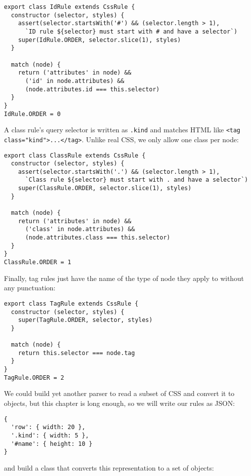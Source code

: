 \documentclass[krantzl]{krantz}
\begin{document}
\begin{lstlisting}[frame=tblr]
export class IdRule extends CssRule {
  constructor (selector, styles) {
    assert(selector.startsWith('#') && (selector.length > 1),
      `ID rule ${selector} must start with # and have a selector`)
    super(IdRule.ORDER, selector.slice(1), styles)
  }

  match (node) {
    return ('attributes' in node) &&
      ('id' in node.attributes) &&
      (node.attributes.id === this.selector)
  }
}
IdRule.ORDER = 0
\end{lstlisting}



A class rule’s query selector is written as \texttt{.kind} and matches HTML like \texttt{<tag class="kind">...</tag>}.
Unlike real CSS,
we only allow one class per node:


\begin{lstlisting}[frame=tblr]
export class ClassRule extends CssRule {
  constructor (selector, styles) {
    assert(selector.startsWith('.') && (selector.length > 1),
      `Class rule ${selector} must start with . and have a selector`)
    super(ClassRule.ORDER, selector.slice(1), styles)
  }

  match (node) {
    return ('attributes' in node) &&
      ('class' in node.attributes) &&
      (node.attributes.class === this.selector)
  }
}
ClassRule.ORDER = 1
\end{lstlisting}



Finally,
tag rules just have the name of the type of node they apply to without any punctuation:


\begin{lstlisting}[frame=tblr]
export class TagRule extends CssRule {
  constructor (selector, styles) {
    super(TagRule.ORDER, selector, styles)
  }

  match (node) {
    return this.selector === node.tag
  }
}
TagRule.ORDER = 2
\end{lstlisting}



We could build yet another parser to read a subset of CSS and convert it to objects,
but this chapter is long enough,
so we will write our rules as JSON:

\begin{lstlisting}[frame=tblr]
{
  'row': { width: 20 },
  '.kind': { width: 5 },
  '#name': { height: 10 }
}
\end{lstlisting}


\noindent and build a class that converts this representation to a set of objects:
\end{document}

